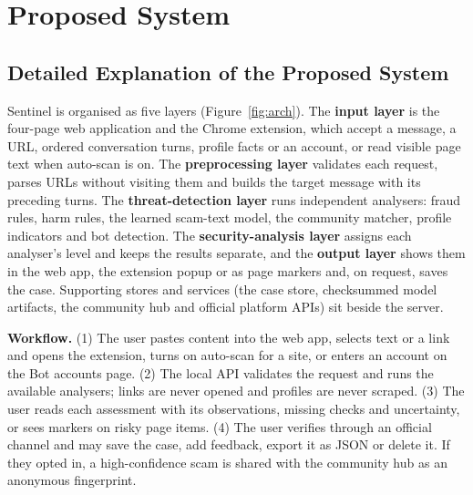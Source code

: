 \onehalfspacing
\pagestyle{fancy}
\fancyhf{}
\renewcommand{\headrulewidth}{0pt}
\cfoot{\thepage}
\chapter{Proposed System}

\section{Detailed Explanation of the Proposed System}
\noindent Sentinel is organised as five layers (Figure~\ref{fig:arch}). The \textbf{input layer} is the four-page web application and the Chrome extension, which accept a message, a URL, ordered conversation turns, profile facts or an account, or read visible page text when auto-scan is on. The \textbf{preprocessing layer} validates each request, parses URLs without visiting them and builds the target message with its preceding turns. The \textbf{threat-detection layer} runs independent analysers: fraud rules, harm rules, the learned scam-text model, the community matcher, profile indicators and bot detection. The \textbf{security-analysis layer} assigns each analyser's level and keeps the results separate, and the \textbf{output layer} shows them in the web app, the extension popup or as page markers and, on request, saves the case. Supporting stores and services (the case store, checksummed model artifacts, the community hub and official platform APIs) sit beside the server.

\noindent\textbf{Workflow.} (1) The user pastes content into the web app, selects text or a link and opens the extension, turns on auto-scan for a site, or enters an account on the Bot accounts page. (2) The local API validates the request and runs the available analysers; links are never opened and profiles are never scraped. (3) The user reads each assessment with its observations, missing checks and uncertainty, or sees markers on risky page items. (4) The user verifies through an official channel and may save the case, add feedback, export it as JSON or delete it. If they opted in, a high-confidence scam is shared with the community hub as an anonymous fingerprint.\\

